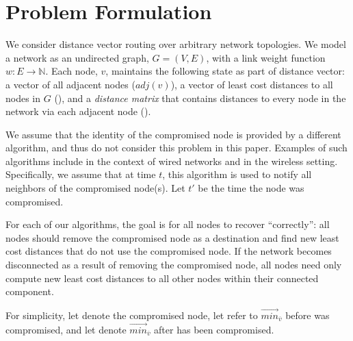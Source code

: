 \section{Problem Formulation}
\label{sec:problem}

We consider distance vector routing \cite{Gall87} over arbitrary network topologies. We model a network as an undirected graph, $G=(V,E)$,
with a link weight function $w: E \rightarrow \mathbb{N}$.
Each node, $v$, maintains the following state as part of distance vector: a vector of all adjacent nodes ($adj(v)$), a vector of least cost distances to all
nodes in $G$ (\minvvs), and a \emph{distance matrix} that contains distances to every node in the network via each adjacent node (\dmatrixvs). 

We assume that the identity of the compromised node is provided by a different algorithm, and thus do not consider this problem in this paper.
Examples of such algorithms include \cite{Arini, Feam, Feldmann}
in the context of wired networks and \cite{Paul02} in the wireless setting. 
Specifically, we assume that at time $t$, this algorithm is used to notify all neighbors of the 
compromised node(s). Let $t'$ be the time the node was compromised.

For each of our algorithms, the goal is for all nodes to recover ``correctly'': all nodes should remove the compromised node as a destination and find
new least cost distances that do not use the compromised node. If the network becomes disconnected as a result of removing the compromised node, all
nodes need only compute new least cost distances to all other nodes within their connected component.

For simplicity, let \bad denote the compromised node, let \oldvector refer to $\overrightarrow{min}_{\overline{v}}$ 
before \bad was compromised, and let \badvector denote $\overrightarrow{min}_{\overline{v}}$ after \bad has been compromised.


